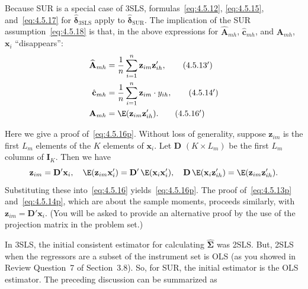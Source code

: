 Because SUR is a special case of 3SLS, formulas~\eqref{eq:4.5.12},
\eqref{eq:4.5.15}, and~\eqref{eq:4.5.17} for $\hat{\boldsymbol{\delta}}_{\mathrm{3SLS}}$
apply to $\hat{\boldsymbol{\delta}}_{\mathrm{SUR}}$.
The implication of the SUR assumption~\eqref{eq:4.5.18} is that, in
the above expressions for $\widehat{\mathbf{A}}_{mh}$, $\hat{\mathbf{c}}_{mh}$,
and $\mathbf{A}_{mh}$, $\mathbf{x}_i$ ``disappears'':
\begin{align}
\widehat{\mathbf{A}}_{mh} &= \frac{1}{n} \sum_{i=1}^{n}
\mathbf{z}_{im} \mathbf{z}_{ih}',
\tag{4.5.13$'$} \label{eq:4.5.13p} \\
\hat{\mathbf{c}}_{mh} &= \frac{1}{n} \sum_{i=1}^{n}
\mathbf{z}_{im} \cdot y_{ih},
\tag{4.5.14$'$} \label{eq:4.5.14p} \\
\mathbf{A}_{mh} &= \E(\mathbf{z}_{im} \mathbf{z}_{ih}').
\tag{4.5.16$'$} \label{eq:4.5.16p}
\end{align}

Here we give a proof of~\eqref{eq:4.5.16p}. Without loss of generality, suppose
$\mathbf{z}_{im}$ is the first $L_m$ elements of the $K$ elements of $\mathbf{x}_i$.
Let $\mathbf{D}$ $(K \times L_m)$ be the first $L_m$ columns of $\mathbf{I}_K$.
Then we have
\[
\mathbf{z}_{im} = \mathbf{D}' \mathbf{x}_i, \quad
\E(\mathbf{z}_{im} \mathbf{x}_i') = \mathbf{D}'\, \E(\mathbf{x}_i \mathbf{x}_i'), \quad
\mathbf{D}\, \E(\mathbf{x}_i \mathbf{z}_{ih}') = \E(\mathbf{z}_{im} \mathbf{z}_{ih}').
\]
Substituting these into~\eqref{eq:4.5.16} yields~\eqref{eq:4.5.16p}.
The proof of~\eqref{eq:4.5.13p} and~\eqref{eq:4.5.14p}, which are about the sample
moments, proceeds similarly, with $\mathbf{z}_{im} = \mathbf{D}' \mathbf{x}_i$.
(You will be asked to provide an alternative proof by the use of the projection matrix
in the problem set.)

In 3SLS, the initial consistent estimator for calculating
$\widehat{\boldsymbol{\Sigma}}$ was 2SLS. But, 2SLS when the regressors are a subset
of the instrument set is OLS (as you showed in Review Question~7 of Section~3.8).
So, for SUR, the initial estimator is the OLS estimator. The preceding discussion
can be summarized as

